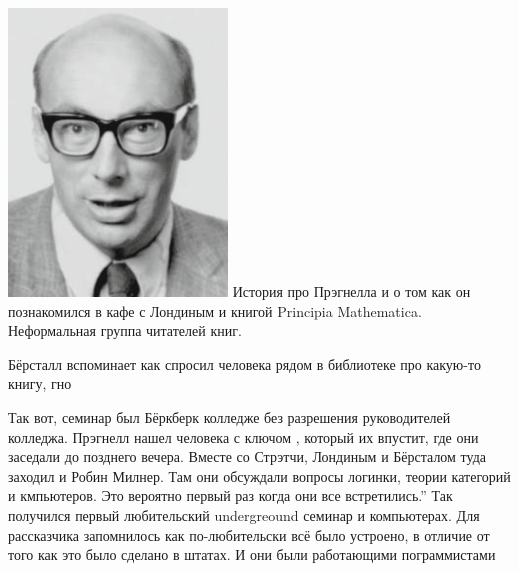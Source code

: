 \documentclass[14pt]{matmex-diploma-custom}
\begin{document}
\includegraphics[angle=0,scale=0.585]{220px-Peter_Landin.png}
История про Прэгнелла и о том как он познакомился в кафе с Лондиным и книгой Principia Mathematica. Неформальная группа читателей книг. 
\begin{framed}
Бёрсталл вспоминает как спросил человека рядом в библиотеке про какую-то книгу, гно
\end{framed}

Так вот, семинар был Бёркберк колледже без разрешения руководителей колледжа. Прэгнелл нашел человека с ключом , который их впустит, где они заседали до позднего вечера. Вместе  со Стрэтчи, Лондиным и Бёрсталом туда заходил и Робин Милнер. Там они обсуждали вопросы логинки, теории категорий и кмпьютеров. Это вероятно первый раз когда они все встретились.” Так получился первый любительский undergreound семинар и компьютерах. Для рассказчика запомнилось как по-любительски всё было устроено, в отличие от того как это было сделано в штатах. И они были работающими пограммистами
\end{document}
